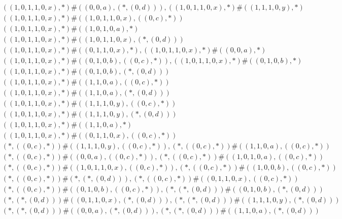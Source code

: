 \begin{align*}
	 & \qquad ((1, 0, 1, 1, 0, x), *) \# ((0, 0, a), (*, (0, d))), ((1, 0, 1, 1, 0, x), *) \# ((1, 1, 1, 0, y), *) \\ 
	 & \qquad ((1, 0, 1, 1, 0, x), *) \# ((1, 0, 1, 1, 0, x), ((0, c), *)) \\ 
	 & \qquad ((1, 0, 1, 1, 0, x), *) \# ((1, 0, 1, 0, a), *) \\ 
	 & \qquad ((1, 0, 1, 1, 0, x), *) \# ((1, 0, 1, 1, 0, x), (*, (0, d))) \\ 
	 & \qquad ((1, 0, 1, 1, 0, x), *) \# ((0, 1, 1, 0, x), *), ((1, 0, 1, 1, 0, x), *) \# ((0, 0, a), *) \\ 
	 & \qquad ((1, 0, 1, 1, 0, x), *) \# ((0, 1, 0, b), ((0, c), *)), ((1, 0, 1, 1, 0, x), *) \# ((0, 1, 0, b), *) \\ 
	 & \qquad ((1, 0, 1, 1, 0, x), *) \# ((0, 1, 0, b), (*, (0, d))) \\ 
	 & \qquad ((1, 0, 1, 1, 0, x), *) \# ((1, 1, 0, a), ((0, c), *)) \\ 
	 & \qquad ((1, 0, 1, 1, 0, x), *) \# ((1, 1, 0, a), (*, (0, d))) \\ 
	 & \qquad ((1, 0, 1, 1, 0, x), *) \# ((1, 1, 1, 0, y), ((0, c), *)) \\ 
	 & \qquad ((1, 0, 1, 1, 0, x), *) \# ((1, 1, 1, 0, y), (*, (0, d))) \\ 
	 & \qquad ((1, 0, 1, 1, 0, x), *) \# ((1, 1, 0, a), *) \\ 
	 & \qquad ((1, 0, 1, 1, 0, x), *) \# ((0, 1, 1, 0, x), ((0, c), *)) \\ 
	 & \qquad (*, ((0, c), *)) \# ((1, 1, 1, 0, y), ((0, c), *)), (*, ((0, c), *)) \# ((1, 1, 0, a), ((0, c), *)) \\ 
	 & \qquad (*, ((0, c), *)) \# ((0, 0, a), ((0, c), *)), (*, ((0, c), *)) \# ((1, 0, 1, 0, a), ((0, c), *)) \\ 
	 & \qquad (*, ((0, c), *)) \# ((1, 0, 1, 1, 0, x), ((0, c), *)), (*, ((0, c), *)) \# ((1, 0, 0, b), ((0, c), *)) \\ 
	 & \qquad (*, ((0, c), *)) \# (*, (*, (0, d))), (*, ((0, c), *)) \# ((0, 1, 1, 0, x), ((0, c), *)) \\ 
	 & \qquad (*, ((0, c), *)) \# ((0, 1, 0, b), ((0, c), *)), (*, (*, (0, d))) \# ((0, 1, 0, b), (*, (0, d))) \\ 
	 & \qquad (*, (*, (0, d))) \# ((0, 1, 1, 0, x), (*, (0, d))), (*, (*, (0, d))) \# ((1, 1, 1, 0, y), (*, (0, d))) \\ 
	 & \qquad (*, (*, (0, d))) \# ((0, 0, a), (*, (0, d))), (*, (*, (0, d))) \# ((1, 1, 0, a), (*, (0, d))) \\ 

\end{align*}
